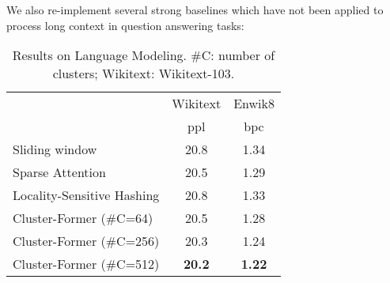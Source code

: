 We also re-implement several strong baselines which have not been applied to process long context in question answering tasks:


\begin{table}
\centering
\setlength{\tabcolsep}{4.3pt}
\begin{tabular}{lcc}
\toprule
                           & Wikitext & Enwik8\\
                           & ppl         & bpc    \\
\midrule

Sliding window       & 20.8        & 1.34   \\
Sparse Attention    & 20.5        & 1.29   \\
Locality-Sensitive Hashing   & 20.8        & 1.33   \\
\midrule
Cluster-Former (\#C=64)    & 20.5        & 1.28   \\
Cluster-Former (\#C=256)   & 20.3        & 1.24   \\
Cluster-Former (\#C=512)   & \textbf{20.2}        & \textbf{1.22}  \\
\bottomrule
\end{tabular}
\caption{Results on Language Modeling.  \#C: number of clusters;  Wikitext: Wikitext-103.}
\label{tbl:lm}
\end{table}

